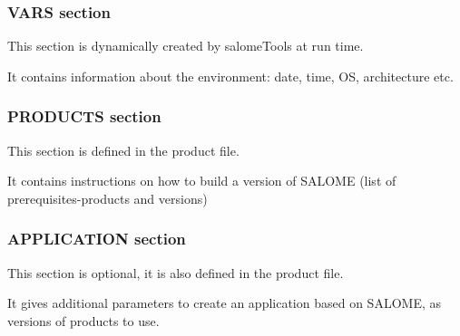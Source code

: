 \documentclass[a4paper,10pt,english]{sphinxmanual}
\begin{document}
\subsubsection{VARS section}
\label{\detokenize{configuration:vars-section}}\label{\detokenize{configuration:id1}}
\begin{DUlineblock}{0em}
\item[] This section is dynamically created by salomeTools at run time.
\item[] It contains information about the environment: date, time, OS, architecture etc.
\end{DUlineblock}

%
\begin{sphinxVerbatim}[commandchars=\\\{\}]
   
\end{sphinxVerbatim}


\subsubsection{PRODUCTS section}
\label{\detokenize{configuration:products-section}}
\begin{DUlineblock}{0em}
\item[] This section is defined in the product file.
\item[] It contains instructions on how to build a version of SALOME (list of prerequisites-products and versions)
\end{DUlineblock}

%
\begin{sphinxVerbatim}[commandchars=\\\{\}]
    
\end{sphinxVerbatim}


\subsubsection{APPLICATION section}
\label{\detokenize{configuration:application-section}}
\begin{DUlineblock}{0em}
\item[] This section is optional, it is also defined in the product file.
\item[] It gives additional parameters to create an application based on SALOME, as versions of products to use.
\end{DUlineblock}
\end{document}
